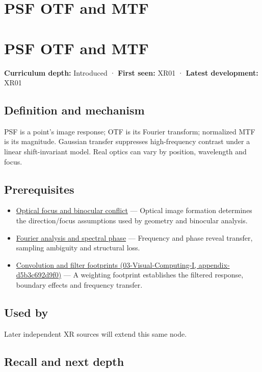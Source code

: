 \hypertarget{appendix-8b76b0efd27f}{}
\section*{PSF OTF and MTF}
\section{PSF OTF and MTF}\label{psf-otf-and-mtf}

\textbf{Curriculum depth:} Introduced · \textbf{First seen:} XR01 · \textbf{Latest development:} XR01

\subsection{Definition and mechanism}\label{definition-and-mechanism}

PSF is a point's image response; OTF is its Fourier transform; normalized MTF is its magnitude. Gaussian transfer suppresses high-frequency contrast under a linear shift-invariant model. Real optics can vary by position, wavelength and focus.

\subsection{Prerequisites}\label{prerequisites}

\begin{itemize}
\tightlist
\item
  \hyperref[appendix-f90cee1be7a4]{Optical focus and binocular conflict} --- Optical image formation determines the direction/focus assumptions used by geometry and binocular analysis.
\item
  \hyperref[appendix-b60686ba06a1]{Fourier analysis and spectral phase} --- Frequency and phase reveal transfer, sampling ambiguity and structural loss.
\item
  \href{}{Convolution and filter footprints (03-Visual-Computing-I, appendix-d5b3c692d9f0)} --- A weighting footprint establishes the filtered response, boundary effects and frequency transfer.
\end{itemize}

\subsection{Used by}\label{used-by}

Later independent XR sources will extend this same node.

\subsection{Recall and next depth}\label{recall-and-next-depth}


